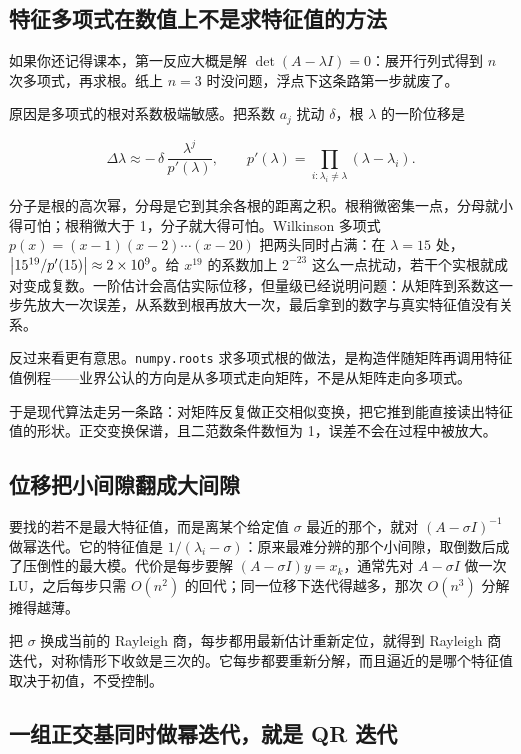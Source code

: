 \subsection{特征多项式在数值上不是求特征值的方法}

如果你还记得课本，第一反应大概是解 \(\det(A-\lambda I)=0\)：展开行列式得到 \(n\) 次多项式，再求根。纸上 \(n=3\) 时没问题，浮点下这条路第一步就废了。

原因是多项式的根对系数极端敏感。把系数 \(a_j\) 扰动 \(\delta\)，根 \(\lambda\) 的一阶位移是

\[
\Delta\lambda\approx-\,\delta\,\frac{\lambda^{j}}{p'(\lambda)},
\qquad
p'(\lambda)=\prod_{i\colon\lambda_i\neq\lambda}(\lambda-\lambda_i).
\]

分子是根的高次幂，分母是它到其余各根的距离之积。根稍微密集一点，分母就小得可怕；根稍微大于 1，分子就大得可怕。Wilkinson 多项式 \(p(x)=(x-1)(x-2)\cdots(x-20)\) 把两头同时占满：在 \(\lambda=15\) 处，\(\left|15^{19}/p'(15)\right|\approx2\times10^{9}\)。给 \(x^{19}\) 的系数加上 \(2^{-23}\) 这么一点扰动，若干个实根就成对变成复数。一阶估计会高估实际位移，但量级已经说明问题：从矩阵到系数这一步先放大一次误差，从系数到根再放大一次，最后拿到的数字与真实特征值没有关系。

反过来看更有意思。\texttt{numpy.roots} 求多项式根的做法，是构造伴随矩阵再调用特征值例程——业界公认的方向是从多项式走向矩阵，不是从矩阵走向多项式。

于是现代算法走另一条路：对矩阵反复做正交相似变换，把它推到能直接读出特征值的形状。正交变换保谱，且二范数条件数恒为 1，误差不会在过程中被放大。

\subsection{位移把小间隙翻成大间隙}

要找的若不是最大特征值，而是离某个给定值 \(\sigma\) 最近的那个，就对 \((A-\sigma I)^{-1}\) 做幂迭代。它的特征值是 \(1/(\lambda_i-\sigma)\)：原来最难分辨的那个小间隙，取倒数后成了压倒性的最大模。代价是每步要解 \((A-\sigma I)y=x_k\)，通常先对 \(A-\sigma I\) 做一次 LU，之后每步只需 \(O(n^2)\) 的回代；同一位移下迭代得越多，那次 \(O(n^3)\) 分解摊得越薄。

把 \(\sigma\) 换成当前的 Rayleigh 商，每步都用最新估计重新定位，就得到 Rayleigh 商迭代，对称情形下收敛是三次的。它每步都要重新分解，而且逼近的是哪个特征值取决于初值，不受控制。

\subsection{一组正交基同时做幂迭代，就是 QR 迭代}

